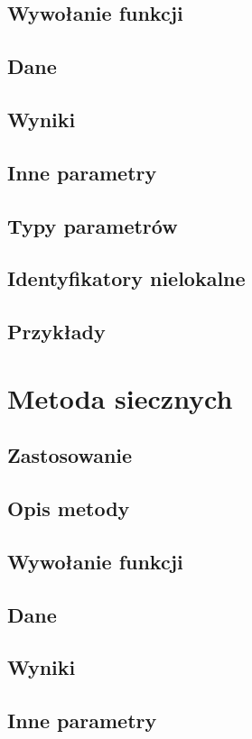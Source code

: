 \documentclass[12pt]{article}
\begin{document}
		\subsection{Wywołanie funkcji}
		\subsection{Dane}
		\subsection{Wyniki}
		\subsection{Inne parametry}
		\subsection{Typy parametrów}
		\subsection{Identyfikatory nielokalne}
		\subsection{Przykłady}

	\section{Metoda siecznych}
		\subsection{Zastosowanie}
		\subsection{Opis metody}
		\subsection{Wywołanie funkcji}
		\subsection{Dane}
		\subsection{Wyniki}
		\subsection{Inne parametry}
\end{document}
